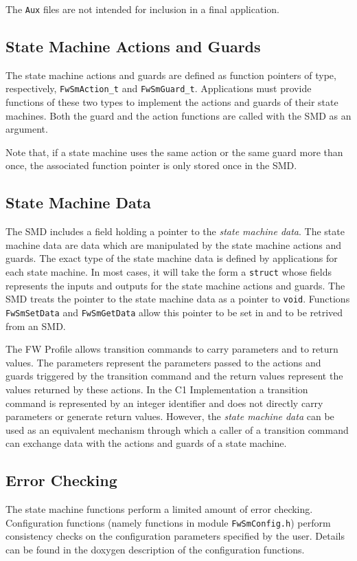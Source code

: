 \documentclass[a4paper,10pt]{article}
\begin{document}
 

The \texttt{Aux} files are not intended for inclusion in a final application.

\subsection{State Machine Actions and Guards}
The state machine actions and guards are defined as function pointers of type, respectively, \texttt{FwSmAction\_t} 
and \texttt{FwSmGuard\_t}. Applications must provide functions of these two types to implement the actions and 
guards of their state machines. Both the guard and the action functions are called with the SMD as an argument.

 

Note that, if a state machine uses the same action or the same guard more than once, the associated function 
pointer is only stored once in the SMD. 

\subsection{State Machine Data}\label{sec:smData}
The SMD includes a field holding a pointer to the \emph{state machine data}. The state machine data are data 
which are manipulated by the state machine actions and guards. The exact type of the state machine data is 
defined by applications for each state machine. In most cases, it will take the form a \texttt{struct} whose 
fields represents the inputs and outputs for the state machine actions and guards. The SMD treats the pointer 
to the state machine data as a pointer to \texttt{void}. Functions \texttt{FwSmSetData} and \texttt{FwSmGetData} 
allow this pointer to be set in and to be retrived from an SMD.

 

The FW Profile allows transition commands to carry parameters and to return values. The parameters represent 
the parameters passed to the actions and guards triggered by the transition command and the return values represent the 
values returned by these actions. In the C1 Implementation a transition command is represented by an integer 
identifier and does not directly carry parameters or generate return values. However, the \emph{state machine data} 
can be used as an equivalent mechanism through which a caller of a transition command can exchange data with the 
actions and guards of a state machine.

\subsection{Error Checking}\label{sec:smErrorChecking}
The state machine functions perform a limited amount of error checking. Configuration functions (namely functions 
in module \texttt{FwSmConfig.h}) perform consistency checks on the configuration parameters specified by the user. 
Details can be found in the doxygen description of the configuration functions. 
\end{document}
